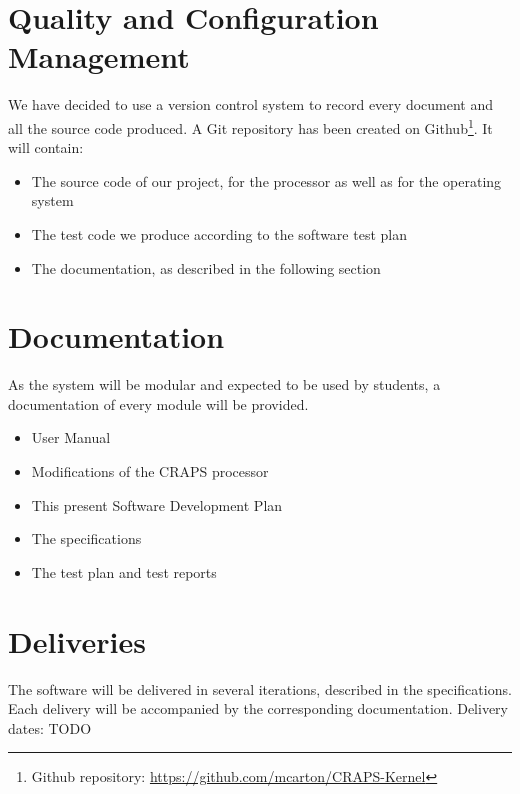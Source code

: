 \documentclass{article}
\begin{document}
  \section{Quality and Configuration Management}
    We have decided to use a version control system to record every document and
    all the source code produced. A Git repository has been created on
    Github\footnote{Github repository:
    \url{https://github.com/mcarton/CRAPS-Kernel}}.
    It will contain:
    \begin{itemize}
      \item The source code of our project, for the processor as well as for the
            operating system
      \item The test code we produce according to the software test plan
      \item The documentation, as described in the following section
    \end{itemize}

  \section{Documentation}
    As the system will be modular and expected to be used by students, a
    documentation of every module will be provided.

    \begin{itemize}
      \item User Manual
      \item Modifications of the CRAPS processor
      \item This present Software Development Plan
      \item The specifications
      \item The test plan and test reports
    \end{itemize}

    \section{Deliveries}
      The software will be delivered in several iterations, described in the
      specifications. Each delivery will be accompanied by the corresponding
      documentation.
      Delivery dates:
        TODO
\end{document}

